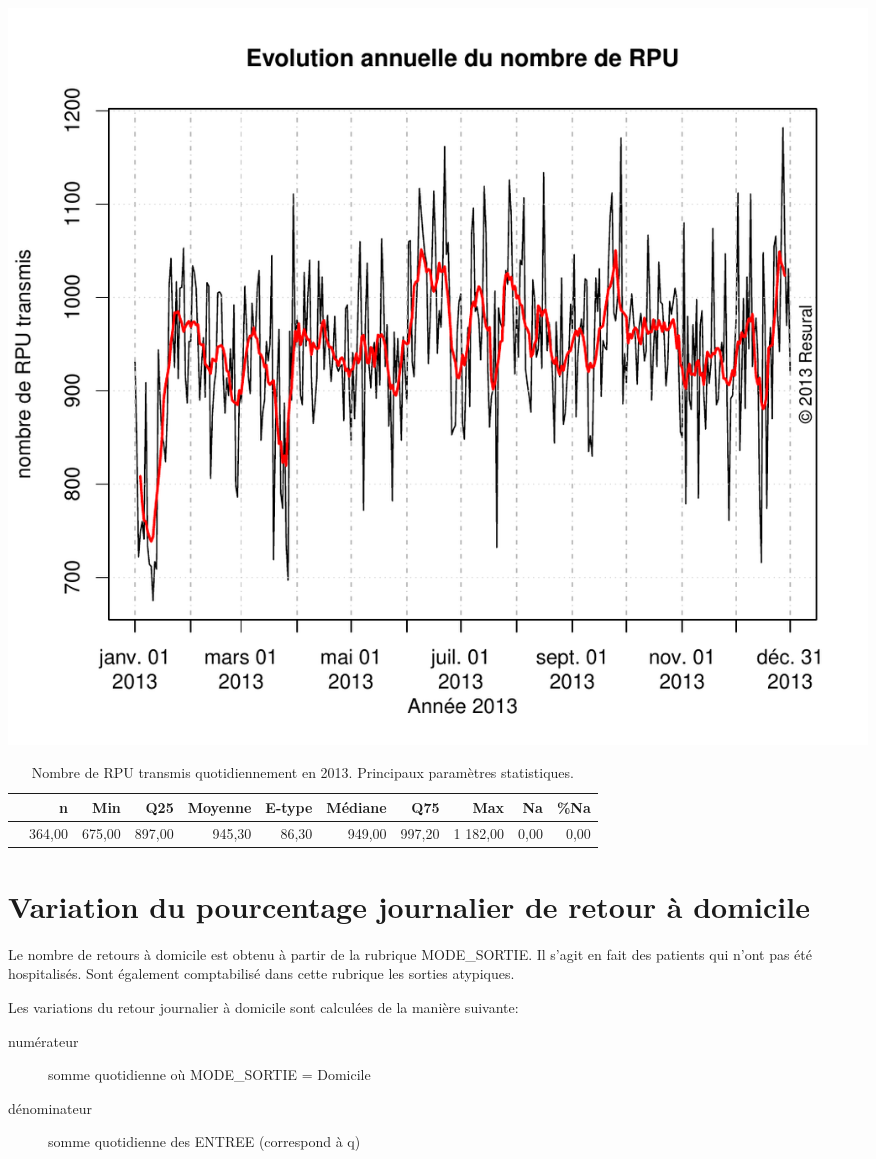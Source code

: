 \documentclass[12pt,english,french,twoside]{book}\usepackage[]{graphicx}\usepackage[]{color}
\makeatletter
\def\maxwidth{ %
  \ifdim\Gin@nat@width>\linewidth
    \linewidth
  \else
    \Gin@nat@width
  \fi
}
\makeatother
\begin{document}
\includegraphics[width=\maxwidth]{figure/passages_totaux-1} 
\begin{table}[ht]
\centering
\begin{tabular}{rrrrrrrrrrr}
  \hline
 & n & Min & Q25 & Moyenne & E-type & Médiane & Q75 & Max & Na & \%Na \\ 
  \hline
 & 364,00 & 675,00 & 897,00 & 945,30 & 86,30 & 949,00 & 997,20 & 1 182,00 & 0,00 & 0,00 \\ 
   \hline
\end{tabular}
\caption[Passages totaux]{Nombre de RPU transmis quotidiennement en 2013. Principaux paramètres statistiques.} 
\label{tab:pt}
\end{table}



\section{Variation du pourcentage journalier de retour à domicile}

Le nombre de retours à domicile est obtenu à partir de la rubrique MODE\_SORTIE. Il s'agit en fait des patients qui n'ont pas été hospitalisés. Sont également comptabilisé dans cette rubrique les sorties atypiques.

Les variations du retour journalier à domicile sont calculées de la manière suivante:
\begin{description}
  \item[numérateur] somme quotidienne où MODE\_SORTIE = Domicile
  \item[dénominateur] somme quotidienne des ENTREE (correspond à q)
\end{description}
\end{document}
